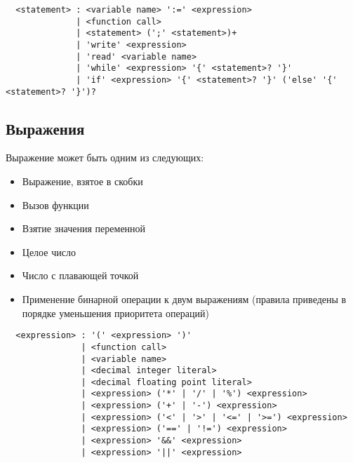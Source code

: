 \documentclass{amsart}
\begin{document}
  \begin{lstlisting}
  <statement> : <variable name> ':=' <expression> 
              | <function call>
              | <statement> (';' <statement>)+
              | 'write' <expression>
              | 'read' <variable name>
              | 'while' <expression> '{' <statement>? '}'
              | 'if' <expression> '{' <statement>? '}' ('else' '{' <statement>? '}')?
  \end{lstlisting}

  \subsection{Выражения}
  Выражение может быть одним из следующих:

  \begin{itemize}
      \item Выражение, взятое в скобки
      \item Вызов функции
      \item Взятие значения переменной
      \item Целое число
      \item Число с плавающей точкой
      \item Применение бинарной операции к двум выражениям (правила приведены в порядке уменьшения приоритета операций)
  \end{itemize}

  \begin{lstlisting}
  <expression> : '(' <expression> ')'
               | <function call>
               | <variable name> 
               | <decimal integer literal>
               | <decimal floating point literal>
               | <expression> ('*' | '/' | '%') <expression>
               | <expression> ('+' | '-') <expression>
               | <expression> ('<' | '>' | '<=' | '>=') <expression>
               | <expression> ('==' | '!=') <expression>
               | <expression> '&&' <expression>
               | <expression> '||' <expression>
  \end{lstlisting}
\end{document}
